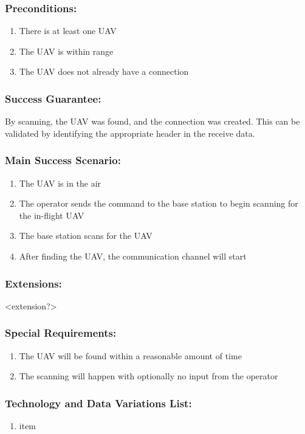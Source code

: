 \documentclass[ProductRequirements.tex]{subfiles}
\begin{document}
		\subsubsection*{Preconditions:}
			\begin{enumerate}\itemsep1pt
				\item There is at least one UAV
				\item The UAV is within range
				\item The UAV does not already have a connection
			\end{enumerate}
		\subsubsection*{Success Guarantee:}
			By scanning, the UAV was found, and the connection was created. This can be validated by identifying the appropriate header in the receive data. 
		\subsubsection*{Main Success Scenario:}
			\begin{enumerate}\itemsep1pt
				\item The UAV is in the air
				\item The operator sends the command to the base station to begin scanning for the in-flight UAV
				\item The base station scans for the UAV
				\item After finding the UAV, the communication channel will start
			\end{enumerate}
		\subsubsection*{Extensions:}
			<extension?>
		\subsubsection*{Special Requirements:}
			\begin{enumerate}\itemsep1pt
				\item The UAV will be found within a reasonable amount of time
				\item The scanning will happen with optionally no input from the operator
			\end{enumerate}
		\subsubsection*{Technology and Data Variations List:}
			\begin{enumerate}\itemsep1pt
				\item item
			\end{enumerate}
\end{document}
